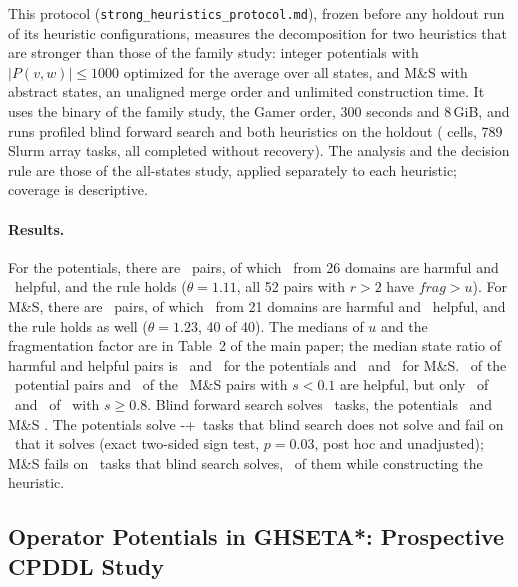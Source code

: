 \documentclass[letterpaper]{article}
\newcommand{\num}[1]{\numprint{#1}}
\newcommand{\fragfactor}{\ensuremath{\mathit{frag}}}
\theoremstyle{plain}
\theoremstyle{definition}
\theoremstyle{remark}
\begin{document}
This protocol (\texttt{strong\_\allowbreak heuristics\_\allowbreak protocol.md}), frozen before any
holdout run of its heuristic configurations, measures the decomposition for
two heuristics that are stronger than those of the family study: integer
potentials with $|P(v,w)|\leq1000$ optimized for the average over all states,
and M\&S with \num{200000} abstract states, an unaligned merge order and
unlimited construction time.  It uses the binary of the family study, the
Gamer order, 300 seconds and 8\,GiB, and runs profiled blind forward search
and both heuristics on the holdout (\num{3156} cells, 789 Slurm array tasks,
all completed without recovery).  The analysis and the decision rule are
those of the all-states study, applied separately to each heuristic;
coverage is descriptive.

\paragraph{Results.}
For the potentials, there are \StPotPairs\ pairs, of which \StPotHarmful\
from 26 domains are harmful and \StPotHelpful\ helpful, and the rule holds
($\theta=1.11$, all 52 pairs with $r>2$ have $\fragfactor>u$).  For M\&S,
there are \StMsPairs\ pairs, of which \StMsHarmful\ from 21 domains are
harmful and \StMsHelpful\ helpful, and the rule holds as well ($\theta=1.23$,
40 of 40).  The medians of $u$ and the fragmentation factor are in Table~2
of the main paper; the median state ratio of harmful and helpful pairs is
\StPotHurtStates\ and \StPotHelpStates\ for the potentials and
\StMsHurtStates\ and \StMsHelpStates\ for M\&S.  \StPotLowHelpful\ of the
\StPotLowPairs\ potential pairs and \StMsLowHelpful\ of the \StMsLowPairs\
M\&S pairs with $s<0.1$ are helpful, but only \StPotHighHelpful\ of
\StPotHighPairs\ and \StMsHighHelpful\ of \StMsHighPairs\ with $s\geq0.8$.
Blind forward search solves \StBlindSolved\ tasks, the potentials
\StPotSolved\ and M\&S \StMsSolved.  The potentials solve
\the\numexpr\StPotSolved-\StBlindSolved+\StPotLost\relax\ tasks that blind
search does not solve and fail on \StPotLost\ that it solves (exact
two-sided sign test, $p=0.03$, post hoc and unadjusted); M\&S fails on
\StMsLost\ tasks that blind search solves, \StMsUnconstructed\ of them while
constructing the heuristic.

\subsection{Operator Potentials in GHSETA*: Prospective CPDDL Study}
\label{sec:supp-cpddl}
\end{document}
